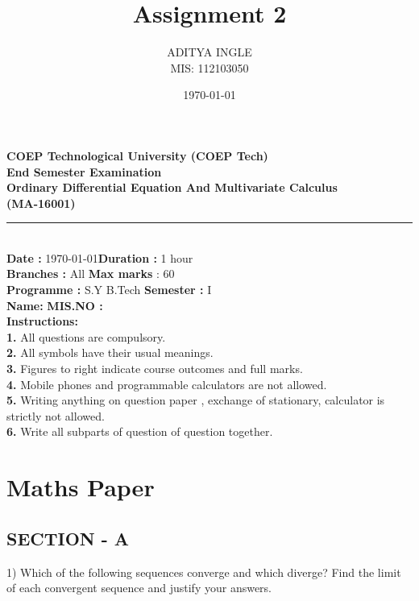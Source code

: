 \documentclass[12pt]{article}
\title{\textbf{Assignment 2}}
\author{ADITYA INGLE\\MIS: 112103050}
\date{\today}
\begin{document}
\maketitle
{}
\newpage
{}
\vspace{10mm}
\begin{center}
\huge \bf {COEP Technological University} 
\linebreak \small{(COEP Tech)}\\
\vspace{6mm}
\large \textbf{End Semester Examination} \\  Ordinary Differential Equation And Multivariate Calculus
\\ (MA-16001)
\end{center}
\par\noindent\rule{\textwidth}{1pt}
\\
\vspace{5mm}
\noindent \textbf{Date :} \today \hfill \textbf {Duration :} 1 hour
\\ \textbf {Branches :} All \hfill  \textbf {Max marks} : 60
\\ \textbf {Programme :} S.Y B.Tech \hfill \textbf {Semester :} I
\linebreak
\\ \textbf {Name:}  \hfill \textbf{MIS.NO : }
\linebreak
\\ \textbf{Instructions:}
\linebreak
\\ \textbf{1.} All questions are compulsory.
\\ \textbf{2.} All symbols have their usual meanings.
\\ \textbf{3.} Figures to right indicate course outcomes and full marks.
\\ \textbf{4.} Mobile phones and programmable calculators are not allowed.
\\ \textbf{5.} Writing anything on question paper , exchange of stationary, calculator is strictly not allowed.
\\ \textbf{6.} Write all subparts of question of question together.
\newpage

\section{Maths Paper}
\vspace{5mm}
\subsection{SECTION - A}
\vspace{2mm}
1) Which of the following sequences converge and which diverge? Find the limit of each convergent sequence and justify your answers.\\
\end{document}
